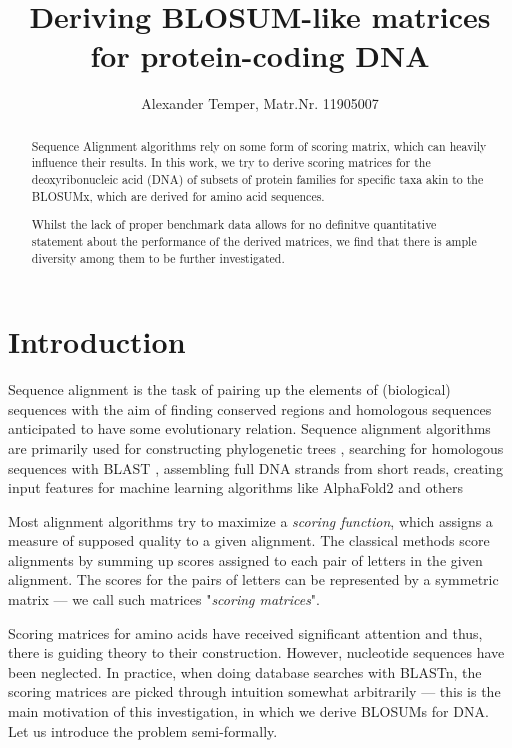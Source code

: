 \documentclass{article}
\title{Deriving BLOSUM-like matrices for protein-coding DNA}
\author{Alexander Temper, Matr.Nr. 11905007}
\begin{document}
\maketitle

\begin{abstract}
    Sequence Alignment algorithms rely on some form of scoring matrix,
    which can heavily influence their results. In this work, we try to derive
    scoring matrices for the deoxyribonucleic acid (DNA) of subsets of protein
    families for specific taxa akin to
    the BLOSUMx, which are derived for amino acid sequences.

    Whilst the lack of proper benchmark data allows for no definitve quantitative
    statement about the performance of the derived matrices, we find that there is ample diversity among them to be further investigated.
\end{abstract}

\tableofcontents

\section{Introduction} Sequence alignment is the task of pairing up the
elements of (biological) sequences with the aim of finding conserved
regions and homologous sequences anticipated to have some
evolutionary relation. Sequence alignment algorithms are primarily used for
constructing phylogenetic trees \cite{chatzouMultipleSequenceAlignment2016}, searching for homologous sequences with BLAST \cite{altschulBasicLocalAlignment1990},
assembling full DNA strands from short reads, creating input features for
machine learning algorithms like AlphaFold2 \cite{jumperHighlyAccurateProtein2021a} and others \cite{chatzouMultipleSequenceAlignment2016}

Most alignment algorithms try to maximize a \emph{scoring function},
which assigns a measure of supposed quality to a given alignment.
The classical methods score
alignments by summing up scores assigned to each pair of letters in the given
alignment. The scores for the pairs of letters can be represented by a
symmetric matrix --- we call such matrices "\emph{scoring matrices}".

Scoring matrices for amino acids have received significant attention and thus,
there is guiding theory to their construction. However, 
nucleotide sequences have been neglected. In practice, when doing database searches
with BLASTn, the scoring matrices are picked through intuition somewhat arbitrarily
--- this is the main motivation of this investigation, in which we derive BLOSUMs 
for DNA. Let us introduce the problem semi-formally.
\end{document}
